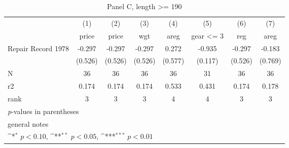 \begin{table}[htbp]\centering
\def\sym#1{\ifmmode^{#1}\else\(^{#1}\)\fi}
\caption{Panel C, length >= 190}
\begin{tabular}{l*{7}{c}}
\toprule
                    &\multicolumn{1}{c}{(1)}&\multicolumn{1}{c}{(2)}&\multicolumn{1}{c}{(3)}&\multicolumn{1}{c}{(4)}&\multicolumn{1}{c}{(5)}&\multicolumn{1}{c}{(6)}&\multicolumn{1}{c}{(7)}\\
                    &\multicolumn{1}{c}{price}&\multicolumn{1}{c}{price}&\multicolumn{1}{c}{wgt}&\multicolumn{1}{c}{areg}&\multicolumn{1}{c}{gear <= 3}&\multicolumn{1}{c}{reg}&\multicolumn{1}{c}{areg}\\
\midrule
Repair Record 1978  &      -0.297         &      -0.297         &      -0.297         &       0.272         &      -0.935         &      -0.297         &      -0.183         \\
                    &     (0.526)         &     (0.526)         &     (0.526)         &     (0.577)         &     (0.117)         &     (0.526)         &     (0.769)         \\
\midrule
N                   &          36         &          36         &          36         &          36         &          31         &          36         &          36         \\
r2                  &       0.174         &       0.174         &       0.174         &       0.533         &       0.431         &       0.174         &       0.178         \\
rank                &           3         &           3         &           3         &           4         &           4         &           3         &           3         \\
\bottomrule
\multicolumn{8}{l}{\footnotesize \textit{p}-values in parentheses}\\
\multicolumn{8}{l}{\footnotesize general notes}\\
\multicolumn{8}{l}{\footnotesize \sym{*} \(p<0.10\), \sym{**} \(p<0.05\), \sym{***} \(p<0.01\)}\\
\end{tabular}
\end{table}
